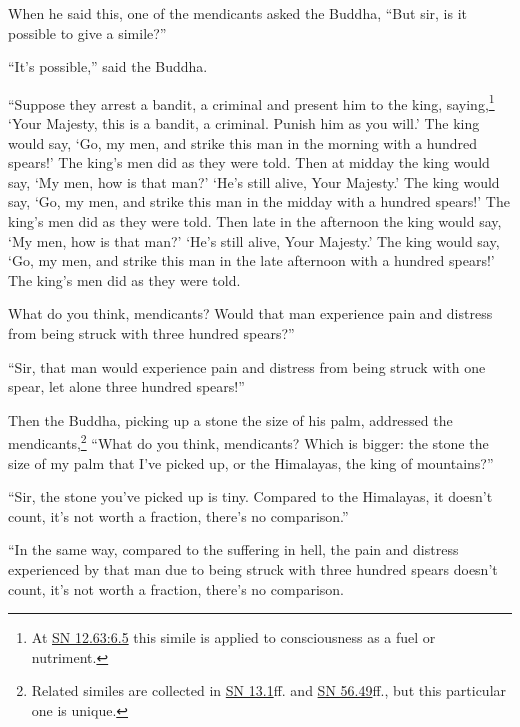 \documentclass[12pt,openany]{book}%
\begin{document}
When he said this, one of the mendicants asked the Buddha, “But sir, is it possible to give a simile?” 

“It’s possible,” said the Buddha. 

“Suppose they arrest a bandit, a criminal and present him to the king, saying,\footnote{At \href{https://suttacentral.net/sn12.63/en/sujato\#6.5}{SN 12.63:6.5} this simile is applied to consciousness as a fuel or nutriment. } ‘Your Majesty, this is a bandit, a criminal. Punish him as you will.’ The king would say, ‘Go, my men, and strike this man in the morning with a hundred spears!’ The king’s men did as they were told. Then at midday the king would say, ‘My men, how is that man?’ ‘He’s still alive, Your Majesty.’ The king would say, ‘Go, my men, and strike this man in the midday with a hundred spears!’ The king’s men did as they were told. Then late in the afternoon the king would say, ‘My men, how is that man?’ ‘He’s still alive, Your Majesty.’ The king would say, ‘Go, my men, and strike this man in the late afternoon with a hundred spears!’ The king’s men did as they were told. 

What do you think, mendicants? Would that man experience pain and distress from being struck with three hundred spears?” 

“Sir, that man would experience pain and distress from being struck with one spear, let alone three hundred spears!” 

Then the Buddha, picking up a stone the size of his palm, addressed the mendicants,\footnote{Related similes are collected in \href{https://suttacentral.net/sn13.1/en/sujato}{SN 13.1}ff. and \href{https://suttacentral.net/sn56.49/en/sujato}{SN 56.49}ff., but this particular one is unique. } “What do you think, mendicants? Which is bigger: the stone the size of my palm that I’ve picked up, or the Himalayas, the king of mountains?” 

“Sir, the stone you’ve picked up is tiny. Compared to the Himalayas, it doesn’t count, it’s not worth a fraction, there’s no comparison.” 

“In the same way, compared to the suffering in hell, the pain and distress experienced by that man due to being struck with three hundred spears doesn’t count, it’s not worth a fraction, there’s no comparison. 
\end{document}
